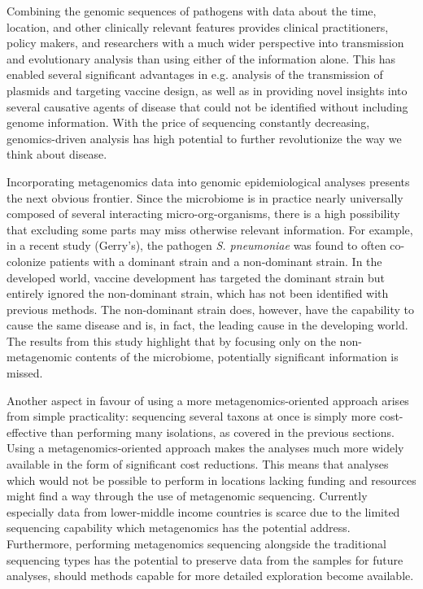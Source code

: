 \documentclass[officiallayout]{tktla}
\begin{document}
Combining the genomic sequences of pathogens with data about the time,
location, and other clinically relevant features provides clinical
practitioners, policy makers, and researchers with a much wider
perspective into transmission and evolutionary analysis than using
either of the information alone. This has enabled several significant
advantages in e.g. analysis of the transmission of plasmids and
targeting vaccine design, as well as in providing novel insights into
several causative agents of disease that could not be identified
without including genome information. With the price of sequencing
constantly decreasing, genomics-driven analysis has high potential to
further revolutionize the way we think about disease.

Incorporating metagenomics data into genomic epidemiological analyses
presents the next obvious frontier. Since the microbiome is in
practice nearly universally composed of several interacting
micro-org-organisms, there is a high possibility that excluding some parts
may miss otherwise relevant information. For example, in a recent
study (Gerry's), the pathogen \textit{S. pneumoniae} was found to
often co-colonize patients with a dominant strain and a non-dominant
strain. In the developed world, vaccine development has targeted the
dominant strain but entirely ignored the non-dominant strain, which has
not been identified with previous methods. The non-dominant strain
does, however, have the capability to cause the same disease and is,
in fact, the leading cause in the developing world. The results from
this study highlight that by focusing only on the non-metagenomic
contents of the microbiome, potentially significant information is
missed.

Another aspect in favour of using a more metagenomics-oriented
approach arises from simple practicality: sequencing several taxons at
once is simply more cost-effective than performing many isolations, as
covered in the previous sections. Using a metagenomics-oriented
approach makes the analyses much more widely available in the form of
significant cost reductions. This means that analyses which would not
be possible to perform in locations lacking funding and resources
might find a way through the use of metagenomic sequencing. Currently
especially data from lower-middle income countries is scarce due to
the limited sequencing capability which metagenomics has the potential
address. Furthermore, performing metagenomics sequencing alongside the
traditional sequencing types has the potential to preserve data from
the samples for future analyses, should methods capable for more
detailed exploration become available.
\end{document}
